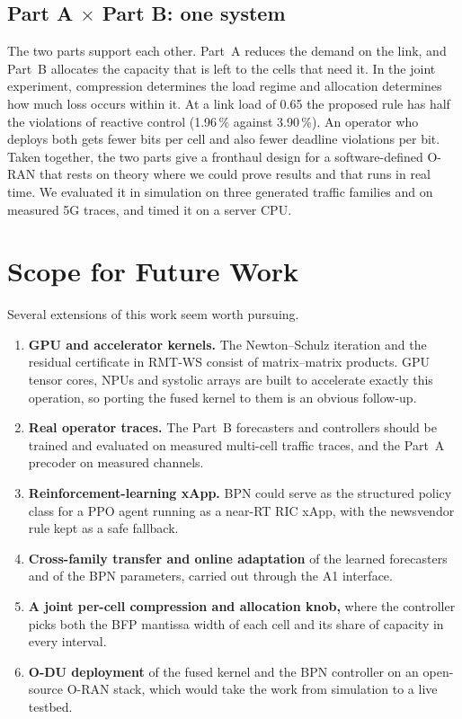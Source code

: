 \subsection*{Part A $\times$ Part B: one system}
The two parts support each other. Part~A reduces the demand on the link, and Part~B allocates the capacity that is left to the cells that need it. In the joint experiment, compression determines the load regime and allocation determines how much loss occurs within it. At a link load of 0.65 the proposed rule has half the violations of reactive control (1.96\,\% against 3.90\,\%). An operator who deploys both gets fewer bits per cell and also fewer deadline violations per bit. Taken together, the two parts give a fronthaul design for a software-defined O-RAN that rests on theory where we could prove results and that runs in real time. We evaluated it in simulation on three generated traffic families and on measured 5G traces, and timed it on a server CPU.

\section{Scope for Future Work}

Several extensions of this work seem worth pursuing.
\begin{enumerate}
  \item \textbf{GPU and accelerator kernels.} The Newton--Schulz iteration and the residual certificate in RMT-WS consist of matrix--matrix products. GPU tensor cores, NPUs and systolic arrays are built to accelerate exactly this operation, so porting the fused kernel to them is an obvious follow-up.
  \item \textbf{Real operator traces.} The Part~B forecasters and controllers should be trained and evaluated on measured multi-cell traffic traces, and the Part~A precoder on measured channels.
  \item \textbf{Reinforcement-learning xApp.} BPN could serve as the structured policy class for a PPO agent running as a near-RT RIC xApp, with the newsvendor rule kept as a safe fallback.
  \item \textbf{Cross-family transfer and online adaptation} of the learned forecasters and of the BPN parameters, carried out through the A1 interface.
  \item \textbf{A joint per-cell compression and allocation knob,} where the controller picks both the BFP mantissa width of each cell and its share of capacity in every interval.
  \item \textbf{O-DU deployment} of the fused kernel and the BPN controller on an open-source O-RAN stack, which would take the work from simulation to a live testbed.
\end{enumerate}
